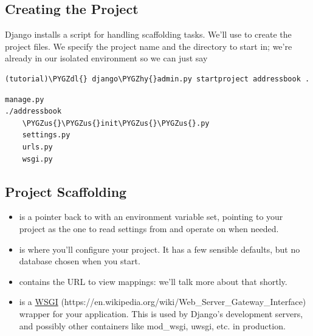 \documentclass[letterpaper,10pt,english]{sphinxmanual}
\def\PYGZus{\char`\_}
\def\PYGZdl{\char`\$}
\def\PYGZhy{\char`\-}
\begin{document}
\subsection{Creating the Project}
\label{tutorial/getting-started:creating-the-project}
Django installs a  script for handling scaffolding
tasks. We'll use  to create the project files. We
specify the project name and the directory to start in; we're already
in our isolated environment so we can just say 

\begin{Verbatim}[commandchars=\\\{\}]
(tutorial)\PYGZdl{} django\PYGZhy{}admin.py startproject addressbook .
\end{Verbatim}

\begin{Verbatim}[commandchars=\\\{\}]
manage.py
./addressbook
    \PYGZus{}\PYGZus{}init\PYGZus{}\PYGZus{}.py
    settings.py
    urls.py
    wsgi.py
\end{Verbatim}


\subsection{Project Scaffolding}
\label{tutorial/getting-started:project-scaffolding}\begin{itemize}
\item {} 
 is a pointer back to  with an
environment variable set, pointing to your project as the one to
read settings from and operate on when needed.

\item {} 
 is where you'll configure your project. It has a
few sensible defaults, but no database chosen when you start.

\item {} 
 contains the URL to view mappings: we'll talk more about
that shortly.

\item {} 
 is a \href{https://en.wikipedia.org/wiki/Web\_Server\_Gateway\_Interface}{WSGI} (https://en.wikipedia.org/wiki/Web\_Server\_Gateway\_Interface) wrapper for your application. This is used
by Django's development servers, and possibly other containers
like mod\_wsgi, uwsgi, etc. in production.

\end{itemize}
\end{document}
